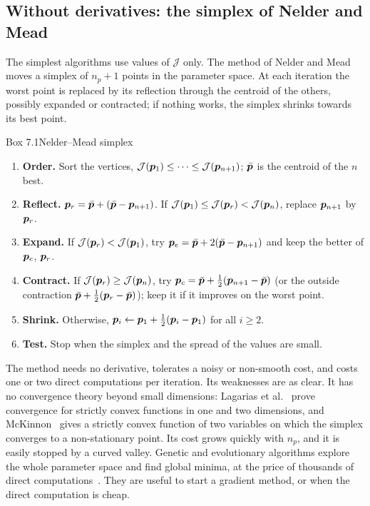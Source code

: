 \subsection{Without derivatives: the simplex of Nelder and Mead}
%
The simplest algorithms use values of $\mathcal J$ only. The method of Nelder and
Mead~\cite{NelderMead1965} moves a simplex of $n_p+1$ points in the parameter
space. At each iteration the worst point is replaced by its reflection through
the centroid of the others, possibly expanded or contracted; if nothing works,
the simplex shrinks towards its best point.

\begin{gbox}{Box 7.1\quad Nelder--Mead simplex}
%
\begin{enumerate}[label=\textbf{\arabic*.},leftmargin=1.6em]
  \item \textbf{Order.} Sort the vertices, $\mathcal J(\bm{p}_1)\le\dots\le\mathcal J(\bm{p}_{n+1})$;
  $\bar{\bm{p}}$ is the centroid of the $n$ best.
  \item \textbf{Reflect.} $\bm{p}_r=\bar{\bm{p}}+(\bar{\bm{p}}-\bm{p}_{n+1})$. If
  $\mathcal J(\bm{p}_1)\le\mathcal J(\bm{p}_r)<\mathcal J(\bm{p}_n)$, replace $\bm{p}_{n+1}$ by $\bm{p}_r$.
  \item \textbf{Expand.} If $\mathcal J(\bm{p}_r)<\mathcal J(\bm{p}_1)$, try
  $\bm{p}_e=\bar{\bm{p}}+2(\bar{\bm{p}}-\bm{p}_{n+1})$ and keep the better of $\bm{p}_e$, $\bm{p}_r$.
  \item \textbf{Contract.} If $\mathcal J(\bm{p}_r)\ge\mathcal J(\bm{p}_n)$, try
  $\bm{p}_c=\bar{\bm{p}}+\tfrac12(\bm{p}_{n+1}-\bar{\bm{p}})$ (or the outside contraction
  $\bar{\bm{p}}+\tfrac12(\bm{p}_r-\bar{\bm{p}})$); keep it if it improves on the worst point.
  \item \textbf{Shrink.} Otherwise, $\bm{p}_i\gets\bm{p}_1+\tfrac12(\bm{p}_i-\bm{p}_1)$ for all
  $i\ge2$.
  \item \textbf{Test.} Stop when the simplex and the spread of the values are small.
\end{enumerate}
\end{gbox}
The method needs no derivative, tolerates a noisy or non-smooth cost, and
costs one or two direct computations per iteration. Its weaknesses are as
clear. It has no convergence theory beyond small dimensions: Lagarias et
al.~\cite{LagariasEtAl1998} prove convergence for strictly convex functions in
one and two dimensions, and McKinnon~\cite{McKinnon1998} gives a strictly
convex function of two variables on which the simplex converges to a
non-stationary point. Its cost grows quickly with $n_p$, and it is easily
stopped by a curved valley. Genetic and evolutionary algorithms explore the
whole parameter space and find global minima, at the price of thousands of
direct computations~\cite{AndradeCamposEtAl2007}. They are useful to start
a gradient method, or when the direct computation is cheap.

